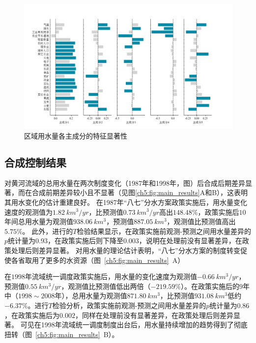 \begin{figure}[htb]
    \centering
    \includegraphics[width=\textwidth]{img/ch5/ch5_variables.png}
    \caption{区域用水量各主成分的特征显著性}\label{ch5:fig:variables}
\end{figure}

\subsection{合成控制结果}\label{result-2}

对黄河流域的总用水量在两次制度变化（1987年和1998年，图）后合成后期差异显著，而在合成前期差异较小且不显著（见图\ref{ch5:fig:main_results}A和B），这表明其用水变化的估计重建良好。
在1987年“八七”分水方案政策实施后，用水量变化速度的观测值为$1.82~km^3/yr$，比预测值$0.73~km^3/yr$高出$148.48\%$，政策实施后$10$年间总用水量为观测值$938.06~km^3$，预测值$887.05~km^3$，观测值比预测值高出$5.75\%$。
此外，进行的$T$检验结果显示，在政策实施前观测-预测之间用水量差异的$p$统计量为$0.93$，在政策实施后则下降至$0.003$，说明在处理前没有显著差异，在政策处理后则差异显著。
对用水量的理论估计表明，“八七”分水方案的制度转变促使各省取用了更多的水资源（图~\ref{ch5:fig:main_results}~A）

在$1998$年流域统一调度政策实施后，用水量的变化速度为观测值$-0.66~km^3/yr$，预测值$0.55~km^3/yr$，观测值比预测值低出两倍（$-219.59\%$）。在政策实施后的$9$年中（$1998 \sim 2008$年），总用水量为观测值$871.80~km^3$，比预测值$931.08~km^3$低约$-6.37\%$。进行$T$检验分析，政策实施前观测-预测之间用水量差异的$p$统计量为$0.86$，在政策实施后为$0.002$，同样在处理前没有显著差异，在政策处理后则差异显著。
可见在1998年流域统一调度制度出台后，用水量持续增加的趋势得到了彻底扭转（图~\ref{ch5:fig:main_results}~B）。

